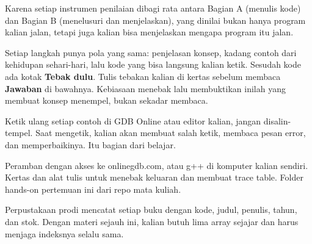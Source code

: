 \documentclass[a4paper]{article}
\begin{document}
\par\vspace{4pt}\par\vspace{6pt}
Karena setiap instrumen penilaian dibagi rata antara Bagian A (menulis kode) dan Bagian B (menelusuri dan menjelaskan), yang dinilai bukan hanya program kalian jalan, tetapi juga kalian bisa menjelaskan mengapa program itu jalan.

Setiap langkah punya pola yang sama: penjelasan konsep, kadang contoh dari kehidupan sehari-hari, lalu kode yang bisa langsung kalian ketik. Sesudah kode ada kotak \textbf{Tebak dulu}. Tulis tebakan kalian di kertas sebelum membaca \textbf{Jawaban} di bawahnya. Kebiasaan menebak lalu membuktikan inilah yang membuat konsep menempel, bukan sekadar membaca.

\begin{Penting}
Ketik ulang setiap contoh di GDB Online atau editor kalian, jangan disalin-tempel. Saat mengetik, kalian akan membuat salah ketik, membaca pesan error, dan memperbaikinya. Itu bagian dari belajar.
\end{Penting}
Peramban dengan akses ke onlinegdb.com, atau g++ di komputer kalian sendiri. Kertas dan alat tulis untuk menebak keluaran dan membuat trace table. Folder hands-on pertemuan ini dari repo mata kuliah.

Perpustakaan prodi mencatat setiap buku dengan kode, judul, penulis, tahun, dan stok. Dengan materi sejauh ini, kalian butuh lima array sejajar dan harus menjaga indeksnya selalu sama.
\end{document}
